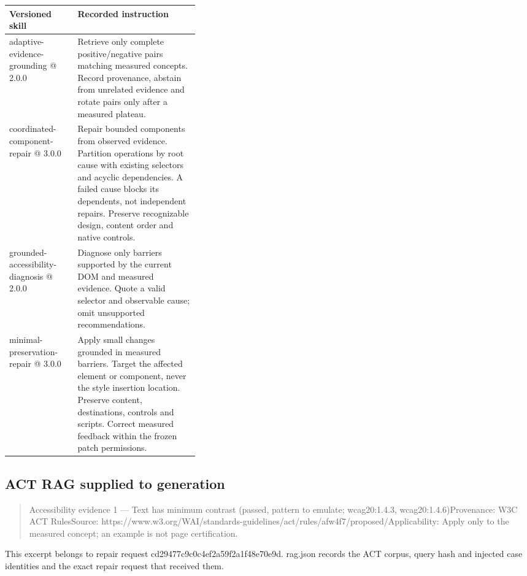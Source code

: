 \documentclass[acmsmall,screen,nonacm]{acmart}
\begin{document}
\begingroup\footnotesize\setlength{\tabcolsep}{3pt}\renewcommand{\arraystretch}{1.14}
\noindent\begin{tabular*}{\linewidth}{@{\extracolsep{\fill}}p{0.3600\linewidth}p{}@{}}\toprule
\raggedright\textbf{Versioned skill} & \raggedright\textbf{Recorded instruction}\tabularnewline\midrule
\raggedright adaptive-evidence-grounding @ 2.0.0 & \raggedright Retrieve only complete positive/negative pairs matching measured concepts. Record provenance, abstain from unrelated evidence and rotate pairs only after a measured plateau.\tabularnewline
\raggedright coordinated-component-repair @ 3.0.0 & \raggedright Repair bounded components from observed evidence. Partition operations by root cause with existing selectors and acyclic dependencies. A failed cause blocks its dependents, not independent repairs. Preserve recognizable design, content order and native controls.\tabularnewline
\raggedright grounded-accessibility-diagnosis @ 2.0.0 & \raggedright Diagnose only barriers supported by the current DOM and measured evidence. Quote a valid selector and observable cause; omit unsupported recommendations.\tabularnewline
\raggedright minimal-preservation-repair @ 3.0.0 & \raggedright Apply small changes grounded in measured barriers. Target the affected element or component, never the style insertion location. Preserve content, destinations, controls and scripts. Correct measured feedback within the frozen patch permissions.\tabularnewline
\bottomrule\end{tabular*}\endgroup\par\medskip

\subsection{ACT RAG supplied to generation}

\begin{quote}\footnotesize\ttfamily\raggedright\sloppy Accessibility evidence 1 — Text has minimum contrast (passed, pattern to emulate; wcag20:1.4.3, wcag20:1.4.6)\newline Provenance: W3C ACT Rules\newline Source: https://www.w3.org/WAI/standards-guidelines/act/rules/afw4f7/proposed/\newline Applicability: Apply only to the measured concept; an example is not page certification.\end{quote}

This excerpt belongs to repair request cd29477c9c0c4ef2a59f2a1f48e70e9d. rag.json records the ACT corpus, query hash and injected case identities and the exact repair request that received them.
\end{document}
